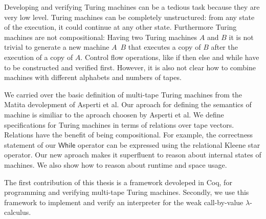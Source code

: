 Developing and verifying Turing machines can be a tedious task because they are very low level.  Turing machines can be completely unstructured:
from any state of the execution, it could continue at any other state.  Furthermore Turing machines are not compositional: Having two Turing
machines $A$ and $B$ it is not trivial to generate a new machine $A\;~B$ that executes a copy of $B$ after the execution of a copy of $A$.
Control flow operations, like if then else and while have to be constructed and verified first.  However, it is also not clear how to combine
machines with different alphabets and numbers of tapes.

We carried over the basic definition of multi-tape Turing machines from the Matita devolepment of Asperti et al.  Our aproach for defining the
semantics of machine is similiar to the aproach choosen by Asperti et al.  We define specifications for Turing machines in terms of relations over
tape vectors.  Relations have the benefit of being compositional.  For example, the correctness statement of our $\mathsf{While}$ operator can be
expressed using the relational Kleene star operator.  Our new aproach makes it superfluent to reason about internal states of machines.  We also
show how to reason about runtime and space usage.

The first contribution of this thesis is a framework devoleped in Coq, for programming and verifying multi-tape Turing machines.  Secondly, we use
this framework to implement and verify an interpreter for the weak call-by-value $\lambda$-calculus.

